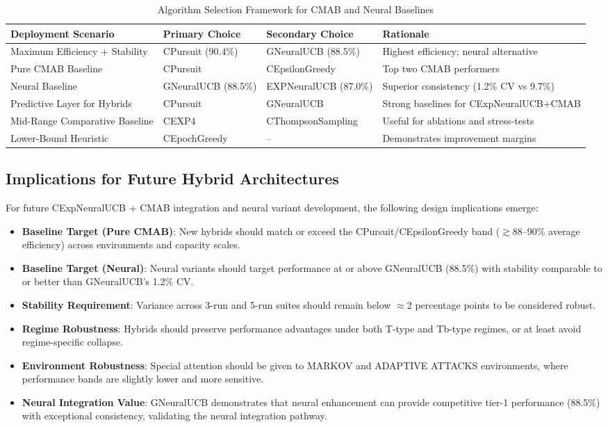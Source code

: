 \documentclass[12pt,a4paper]{article}
\begin{document}
\begin{table}[H]
\footnotesize
\centering
\caption{Algorithm Selection Framework for CMAB and Neural Baselines}
\begin{tabular}{|l|l|l|l|}
\hline
\textbf{Deployment Scenario} & \textbf{Primary Choice} & \textbf{Secondary Choice} & \textbf{Rationale} \\
\hline
\hline
Maximum Efficiency + Stability & CPursuit (90.4\%) & GNeuralUCB (88.5\%) & Highest efficiency; neural alternative \\
Pure CMAB Baseline & CPursuit & CEpsilonGreedy & Top two CMAB performers \\
Neural Baseline & GNeuralUCB (88.5\%) & EXPNeuralUCB (87.0\%) & Superior consistency (1.2\% CV vs 9.7\%) \\
Predictive Layer for Hybrids   & CPursuit & GNeuralUCB & Strong baselines for CExpNeuralUCB+CMAB \\
Mid-Range Comparative Baseline & CEXP4    & CThompsonSampling & Useful for ablations and stress-tests \\
Lower-Bound Heuristic          & CEpochGreedy & --           & Demonstrates improvement margins \\
\hline
\end{tabular}
\end{table}

\subsection{Implications for Future Hybrid Architectures}

For future CExpNeuralUCB + CMAB integration and neural variant development, the following design implications emerge:

\begin{itemize}
\item \textbf{Baseline Target (Pure CMAB)}: New hybrids should match or exceed the CPursuit/CEpsilonGreedy band ($\gtrsim$88–90\% average efficiency) across environments and capacity scales.
\item \textbf{Baseline Target (Neural)}: Neural variants should target performance at or above GNeuralUCB (88.5\%) with stability comparable to or better than GNeuralUCB's 1.2\% CV.
\item \textbf{Stability Requirement}: Variance across 3-run and 5-run suites should remain below $\approx$2 percentage points to be considered robust.
\item \textbf{Regime Robustness}: Hybrids should preserve performance advantages under both T-type and Tb-type regimes, or at least avoid regime-specific collapse.
\item \textbf{Environment Robustness}: Special attention should be given to MARKOV and ADAPTIVE ATTACKS environments, where performance bands are slightly lower and more sensitive.
\item \textbf{Neural Integration Value}: GNeuralUCB demonstrates that neural enhancement can provide competitive tier-1 performance (88.5\%) with exceptional consistency, validating the neural integration pathway.
\end{itemize}
\end{document}

